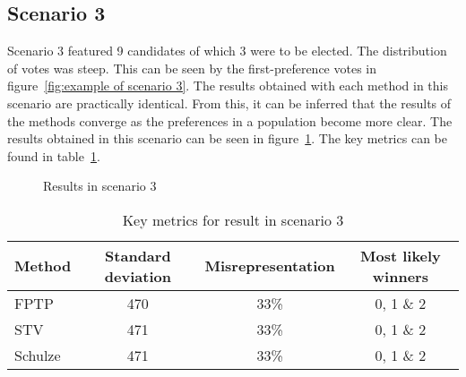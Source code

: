 \documentclass[12pt]{article}
\begin{document}
\subsection{Scenario 3}
Scenario 3 featured 9 candidates of which 3 were to be elected. The distribution of votes was steep. This can be seen by the first-preference votes in figure~\ref{fig:example of scenario 3}. The results obtained with each method in this scenario are practically identical. From this, it can be inferred that the results of the methods converge as the preferences in a population become more clear. The results obtained in this scenario can be seen in figure~\ref{fig:scenario 3 result}. The key metrics can be found in table~\ref{tab:scenario 3 result}.
\begin{figure}[H]
	\centering
	\caption{Results in scenario 3}
\label{fig:scenario 3 result}
\end{figure}

\begin{table}[H]
	\centering
	\caption{Key metrics for result in scenario 3}
\label{tab:scenario 3 result}
	\begin{tabular}{@{}lccc@{}}
		\toprule
		Method & Standard deviation & Misrepresentation & Most likely winners \\ \midrule
		FPTP & 470 & 33\% & 0, 1 \& 2 \\
		STV & 471 & 33\% & 0, 1 \& 2 \\
		Schulze & 471 & 33\% & 0, 1 \& 2  \\ \bottomrule
	\end{tabular}
\end{table}
\end{document}
